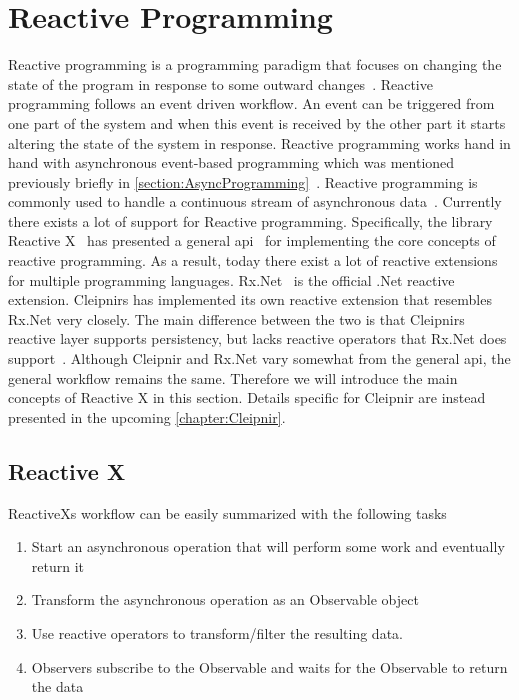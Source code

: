 \section{Reactive Programming}
\label{section:reactive}
Reactive programming is a programming paradigm that focuses on changing the state of the program in response to some outward changes~\cite{WEB:RxProgIntro, DOC:Cleipnir}.
Reactive programming follows an event driven workflow. An event can be triggered from one part of the system and when this event is received by the other part it starts altering the state of the system in response. Reactive programming works hand in hand with asynchronous event-based programming which was mentioned previously briefly in \autoref{section:AsyncProgramming}~\cite[p.~2-3]{BOOK:RxLinq}. Reactive programming is commonly used to handle a continuous stream of asynchronous data~\cite{VIDEO:dotnetsheffReactive}. 
Currently there exists a lot of support for Reactive programming. Specifically, the library Reactive X~\cite{WEB:ReactiveXMainPage} has presented a general \ac{api}~\cite{web:api} for implementing the core concepts of reactive programming. As a result, today there exist a lot of reactive extensions for multiple programming languages. Rx.Net~\cite{Github:ReactiveExtensions} is the official .Net reactive extension. Cleipnirs has implemented its own reactive extension that resembles Rx.Net very closely. The main difference between the two is that Cleipnirs reactive layer supports persistency, but lacks reactive operators that Rx.Net does support~\cite{DOC:Cleipnir}.
Although Cleipnir and Rx.Net vary somewhat from the general \ac{api}, the general workflow remains the same. Therefore we will introduce the main concepts of Reactive X in this section. Details specific for Cleipnir are instead presented in the upcoming \autoref{chapter:Cleipnir}.

\subsection{Reactive X}
ReactiveXs workflow can be easily summarized with the following tasks~\cite{WEB:ReactiveObservable}
\begin{enumerate}
	\item{Start an asynchronous operation that will perform some work and eventually return it}
	\item{Transform the asynchronous operation as an Observable object}
	\item{Use reactive operators to transform/filter the resulting data.}
	\item{Observers subscribe to the Observable and waits for the Observable to return the data}
\end{enumerate}

